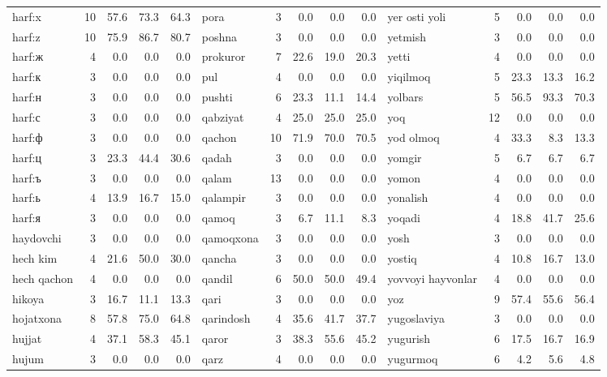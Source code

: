 \documentclass[a4paper,10pt]{article}
\newcommand{\ruT}[1]{{\fontencoding{T2A}\selectfont #1}}
\begin{document}
\begin{longtable}{lrrrr|lrrrr|lrrrr}
harf:x & 10 & 57.6 & 73.3 & 64.3 & pora & 3 & 0.0 & 0.0 & 0.0 & yer osti yo\textquotesingle{}li & 5 & 0.0 & 0.0 & 0.0 \\
harf:z & 10 & 75.9 & 86.7 & 80.7 & poshna & 3 & 0.0 & 0.0 & 0.0 & yetmish & 3 & 0.0 & 0.0 & 0.0 \\
\ruT{harf:ж} & 4 & 0.0 & 0.0 & 0.0 & prokuror & 7 & 22.6 & 19.0 & 20.3 & yetti & 4 & 0.0 & 0.0 & 0.0 \\
\ruT{harf:к} & 3 & 0.0 & 0.0 & 0.0 & pul & 4 & 0.0 & 0.0 & 0.0 & yiqilmoq & 5 & 23.3 & 13.3 & 16.2 \\
\ruT{harf:н} & 3 & 0.0 & 0.0 & 0.0 & pushti & 6 & 23.3 & 11.1 & 14.4 & yo\textquotesingle{}lbars & 5 & 56.5 & 93.3 & 70.3 \\
\ruT{harf:с} & 3 & 0.0 & 0.0 & 0.0 & qabziyat & 4 & 25.0 & 25.0 & 25.0 & yo\textquotesingle{}q & 12 & 0.0 & 0.0 & 0.0 \\
\ruT{harf:ф} & 3 & 0.0 & 0.0 & 0.0 & qachon & 10 & 71.9 & 70.0 & 70.5 & yod olmoq & 4 & 33.3 & 8.3 & 13.3 \\
\ruT{harf:ц} & 3 & 23.3 & 44.4 & 30.6 & qadah & 3 & 0.0 & 0.0 & 0.0 & yomg\textquotesingle{}ir & 5 & 6.7 & 6.7 & 6.7 \\
\ruT{harf:ъ} & 3 & 0.0 & 0.0 & 0.0 & qalam & 13 & 0.0 & 0.0 & 0.0 & yomon & 4 & 0.0 & 0.0 & 0.0 \\
\ruT{harf:ь} & 4 & 13.9 & 16.7 & 15.0 & qalampir & 3 & 0.0 & 0.0 & 0.0 & yonalish & 4 & 0.0 & 0.0 & 0.0 \\
\ruT{harf:я} & 3 & 0.0 & 0.0 & 0.0 & qamoq & 3 & 6.7 & 11.1 & 8.3 & yoqadi & 4 & 18.8 & 41.7 & 25.6 \\
haydovchi & 3 & 0.0 & 0.0 & 0.0 & qamoqxona & 3 & 0.0 & 0.0 & 0.0 & yosh & 3 & 0.0 & 0.0 & 0.0 \\
hech kim & 4 & 21.6 & 50.0 & 30.0 & qancha & 3 & 0.0 & 0.0 & 0.0 & yostiq & 4 & 10.8 & 16.7 & 13.0 \\
hech qachon & 4 & 0.0 & 0.0 & 0.0 & qandil & 6 & 50.0 & 50.0 & 49.4 & yovvoyi hayvonlar & 4 & 0.0 & 0.0 & 0.0 \\
hikoya & 3 & 16.7 & 11.1 & 13.3 & qari & 3 & 0.0 & 0.0 & 0.0 & yoz & 9 & 57.4 & 55.6 & 56.4 \\
hojatxona & 8 & 57.8 & 75.0 & 64.8 & qarindosh & 4 & 35.6 & 41.7 & 37.7 & yugoslaviya & 3 & 0.0 & 0.0 & 0.0 \\
hujjat & 4 & 37.1 & 58.3 & 45.1 & qaror & 3 & 38.3 & 55.6 & 45.2 & yugurish & 6 & 17.5 & 16.7 & 16.9 \\
hujum & 3 & 0.0 & 0.0 & 0.0 & qarz & 4 & 0.0 & 0.0 & 0.0 & yugurmoq & 6 & 4.2 & 5.6 & 4.8 \\

\end{longtable}
\end{document}
